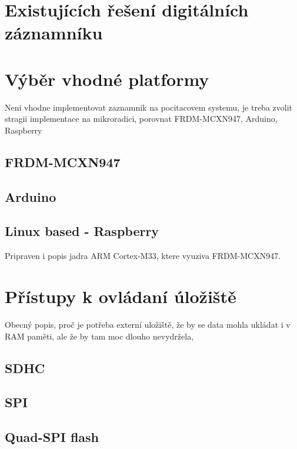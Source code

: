 \section{Existujících řešení digitálních záznamníku}

\section{Výběr vhodné platformy}
Neni vhodne implementovat zaznamnik na pocitacovem systemu, je treba zvolit stragii implementace na mikroradici, porovnat FRDM-MCXN947, Arduino, Raspberry
\subsection{FRDM-MCXN947}

\subsection{Arduino}

\subsection{Linux based - Raspberry}

Pripraven i popis jadra ARM Cortex-M33, ktere vyuziva FRDM-MCXN947.

\section{Přístupy k ovládaní úložiště}
Obecný popis, proč je potřeba externí uložiště, že by se data mohla ukládat i v RAM paměti, ale že by tam moc dlouho nevydržela, 

\subsection{SDHC}

\subsection{SPI}
\subsection{Quad-SPI flash}


